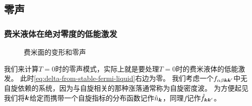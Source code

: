 \subsection{零声}

\subsubsection{费米液体在绝对零度的低能激发}

\begin{figure}
    \centering
    \subfigure[变形的费米面，费米液体在$T=0$时的低能激发普遍具有这个形式]{
        
    }
    \caption{费米面的变形和零声}
\end{figure}


我们来计算$T=0$时的零声模式，实际上就是要处理$T=0$时的费米液体的低能激发。
此时\eqref{eq:delta-from-stable-fermi-liquid}右边为零。
我们考虑一个$f_{\alpha \beta \vb*{k} \vb*{k}'}$中无自旋依赖的系统，因为与自旋相关的那种涨落通常称为自旋密度波。
为方便起见我们将$\vb*{k}$给定而携带一个自旋指标的分布函数记作$\hat{n}_{\vb*{k}}$，同理$f$记作$\hat{f}_{\vb*{k} \vb*{k}'}$。

